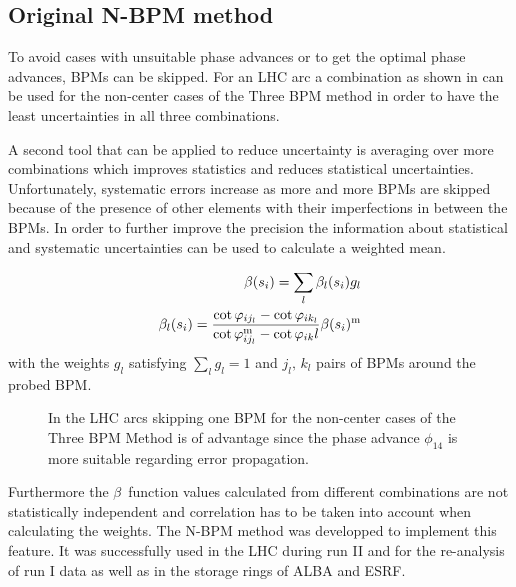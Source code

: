 \subsection{Original N-BPM method}

To avoid cases with unsuitable phase advances or to get the optimal phase advances, BPMs can be
skipped. For an LHC arc a combination as shown in  can be used for the non-center
cases of the Three BPM method in order to have the least uncertainties in all three combinations.

A second tool that can be applied to reduce uncertainty is averaging over more combinations which
improves statistics and reduces statistical uncertainties.
Unfortunately, systematic errors increase
as more and more BPMs are skipped because of the presence of other elements with their imperfections in between the
BPMs.
In order to further improve the precision the information about statistical and systematic
uncertainties can be used to calculate a weighted mean. 

\begin{align}
    \beta(s_i) = \sum\limits_{l} \beta_l(s_i) g_l
    \label{eq_beta_wmean}\\
    \beta_l(s_i) = \frac{\cot\varphi_{ij_l} - \cot\varphi_{ik_l}}{\cot\varphi_{ij_l}^\text{m} - \cot\varphi_{ik}l} \beta(s_i)^\text{m}
    \label{eq_beta_l}
\end{align}
with the weights $g_l$ satisfying
$%
    \sum\limits_l g_l = 1
$%
and $j_l,\,k_l$ pairs of BPMs around the probed BPM.


\begin{figure}
    \centering
    
    \caption{In the LHC arcs skipping one BPM for the non-center cases of the Three BPM Method
    is of advantage since the phase advance $\phi_{14}$
    is more suitable regarding error propagation.}
    \label{fig_skip_one_BPM}
\end{figure}

Furthermore the $\beta$~function values calculated from different combinations are not statistically
independent and correlation has to be taken into account when calculating the weights.
The N-BPM method \cite{AndyNBPM, AndyThesis} was developped to implement this feature.
It was successfully used in the LHC during run II and for the re-analysis of run I data
as well as in the storage rings of ALBA and ESRF.

